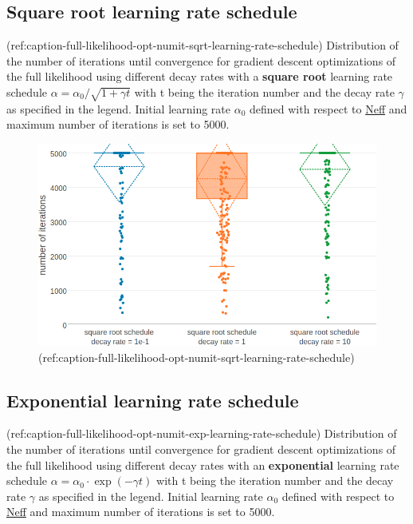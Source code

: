\documentclass[11pt,a4paper,twoside]{book}
\theoremstyle{definition}
\theoremstyle{definition}
\theoremstyle{remark}
\begin{document}
\subsection{Square root learning rate
schedule}\label{square-root-learning-rate-schedule-1}

(ref:caption-full-likelihood-opt-numit-sqrt-learning-rate-schedule)
Distribution of the number of iterations until convergence for gradient
descent optimizations of the full likelihood using different decay rates
with a \textbf{square root} learning rate schedule
\(\alpha = \alpha_0 / \sqrt{1 + \gamma t}\) with t being the iteration
number and the decay rate \(\gamma\) as specified in the legend. Initial
learning rate \(\alpha_0\) defined with respect to
\protect\hyperlink{abbrev}{Neff} and maximum number of iterations is set
to 5000.

\begin{figure}

{\centering \includegraphics[width=0.9\linewidth]{img/full_likelihood/appendix/distribution_numiterations_against_sqrt_learningrate_schedule} 

}

\caption{(ref:caption-full-likelihood-opt-numit-sqrt-learning-rate-schedule)}\label{fig:full-likelihood-opt-numit-sqrt-learning-rate-schedule}
\end{figure}

\subsection{Exponential learning rate
schedule}\label{exponential-learning-rate-schedule-1}

(ref:caption-full-likelihood-opt-numit-exp-learning-rate-schedule)
Distribution of the number of iterations until convergence for gradient
descent optimizations of the full likelihood using different decay rates
with an \textbf{exponential} learning rate schedule
\(\alpha = \alpha_0 \cdot\exp(- \gamma t)\) with t being the iteration
number and the decay rate \(\gamma\) as specified in the legend. Initial
learning rate \(\alpha_0\) defined with respect to
\protect\hyperlink{abbrev}{Neff} and maximum number of iterations is set
to 5000.
\end{document}

